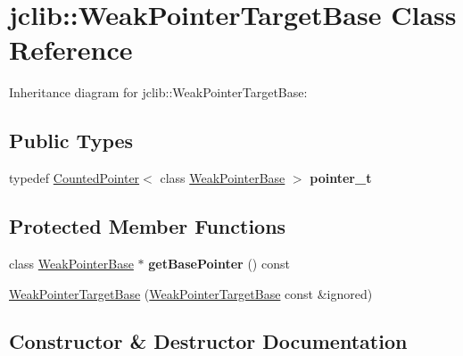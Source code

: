 \hypertarget{classjclib_1_1WeakPointerTargetBase}{}\section{jclib\+:\+:Weak\+Pointer\+Target\+Base Class Reference}
\label{classjclib_1_1WeakPointerTargetBase}


Inheritance diagram for jclib\+:\+:Weak\+Pointer\+Target\+Base\+:
\subsection*{Public Types}
\begin{DoxyCompactItemize}
\item 
\mbox{\label{classjclib_1_1WeakPointerTargetBase_ac4d8f494eabd5dd3fa847d66c6a68069}} 
typedef \hyperlink{classjclib_1_1CountedPointer}{Counted\+Pointer}$<$ class \hyperlink{classjclib_1_1WeakPointerBase}{Weak\+Pointer\+Base} $>$ {\bfseries pointer\+\_\+t}
\end{DoxyCompactItemize}
\subsection*{Protected Member Functions}
\begin{DoxyCompactItemize}
\item 
\mbox{\label{classjclib_1_1WeakPointerTargetBase_a7315693e67c06be34eede70131c1a1c0}} 
class \hyperlink{classjclib_1_1WeakPointerBase}{Weak\+Pointer\+Base} $\ast$ {\bfseries get\+Base\+Pointer} () const
\item 
\hyperlink{classjclib_1_1WeakPointerTargetBase_a1d0c5ff379afcd448a59795579c8b050}{Weak\+Pointer\+Target\+Base} (\hyperlink{classjclib_1_1WeakPointerTargetBase}{Weak\+Pointer\+Target\+Base} const \&ignored)
\end{DoxyCompactItemize}


\subsection{Constructor \& Destructor Documentation}
\mbox{\label{classjclib_1_1WeakPointerTargetBase_a1d0c5ff379afcd448a59795579c8b050}} 
